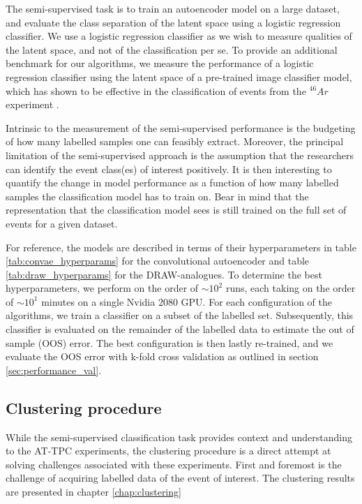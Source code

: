 The semi-supervised task is to train an autoencoder model on a large dataset, and evaluate the class separation of the latent space using a logistic regression classifier. We use a logistic regression classifier as we wish to measure qualities of the latent space, and not of the classification per se. To provide an additional benchmark for our algorithms, we measure the performance of a logistic regression classifier using the latent space of a pre-trained image classifier model, which has shown to be effective in the classification of events from the ${}^{46}Ar$ experiment \cite{Kuchera2019}.

Intrinsic to the measurement of the semi-supervised performance is the budgeting of how many labelled samples one can feasibly extract. Moreover, the principal limitation of the semi-supervised approach is the assumption that the researchers can identify the event class(es) of interest positively. It is then interesting to quantify the change in model performance as a function of how many labelled samples the classification model has to train on. Bear in mind that the representation that the classification model sees is still trained on the full set of events for a given dataset. 

For reference, the models are described in terms of their hyperparameters in table \ref{tab:convae_hyperparams} for the convolutional autoencoder and table \ref{tab:draw_hyperparams} for the DRAW-analogues. To determine the best hyperparameters, we perform on the order of $\sim 10^2$ runs, each taking on the order of $\sim 10^1$ minutes on a single Nvidia $2080$ GPU. For each configuration of the algorithms, we train a classifier on a subset of the labelled set. Subsequently, this classifier is evaluated on the remainder of the labelled data to estimate the out of sample (OOS) error. The best configuration is then lastly re-trained, and we evaluate the OOS error with k-fold cross validation as outlined in section \ref{sec:performance_val}.

\subsection{Clustering procedure}\label{sec:cster_procedure}

While the semi-supervised classification task provides context and understanding to the AT-TPC experiments, the clustering procedure is a direct attempt at solving challenges associated with these experiments. First and foremost is the challenge of acquiring labelled data of the event of interest. The clustering results are presented in chapter \ref{chap:clustering} 

